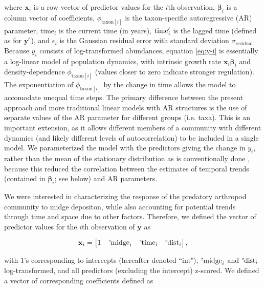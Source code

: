 \noindent where $\mathbf{x}_i$ is a row vector of predictor values for the $i$th
observation,
${\boldsymbol\beta}_i$ is a column vector of coefficients,
$\phi_{\text{taxon}[i]}$ is the taxon-specific autoregressive (AR) parameter,
$\text{time}_i$ is the current time (in years),
$\text{time}\sp{\prime}_i$ is the lagged time (defined as for  $\mathbf{y\sp{\prime}}$),
and $\epsilon_i$  is the Gaussian residual
error with standard deviation $\sigma_{\text{residual}}$.
Because $y_i$ consists of log-transformed abundances, equation \ref{eq:y-i} is
essentially a log-linear model of population dynamics, with intrinsic growth rate
$\mathbf{x}_i{\boldsymbol\beta}_i$ and density-dependence $\phi_{\text{taxon}[i]}$
(values closer to zero indicate stronger regulation).
The exponentiation of $\phi_{\text{taxon}[i]}$ by the change in time allows the model
to accomodate unequal time steps.
The primary difference between the present approach and more traditional linear models
with AR structures \citep[e.g ][]{Zuur2009} is the use of separate values of the AR
parameter for different groups (i.e. taxa).
This is an important extension, as it allows different members of a community with
different dynamics (and likely different levels of autocorrelation) to be included
in a single model.
We parameterized the model with the predictors giving the change in $y_i$,
rather than the mean of the stationary distribution as is conventionally done
\citep{Harvey1990, Ives2006},
because this reduced the correlation between the estimates of temporal trends
(contained in ${\boldsymbol\beta}_i$; see below) and AR parameters.

We were interested in characterizing the response of the predatory arthropod
community to midge depositon, while also accounting for potential trends through
time and space due to other factors.
Therefore, we defined the vector of predictor values for the $i$th observation
of $\mathbf{y}$ as

\begin{equation} \label{eq:x-vec}
    \mathbf{x}_i = \begin{bmatrix}
        1 & {}^z\hspace*{-1pt}\text{midge}_i &
        {}^z\hspace*{-1pt}\text{time}_i & {}^z\hspace*{-1pt}\text{dist}_i
    \end{bmatrix}\text{,}
\end{equation}

\noindent with $1$'s corresponding to intercepts (hereafter denoted ``int"),
${}^z\hspace*{-1pt}\text{midge}_i$ and ${}^z\hspace*{-1pt}\text{dist}_i$ log-transformed,
and all predictors (excluding the intercept) z-scored.
We defined a vector of corresponding coefficients defined as

